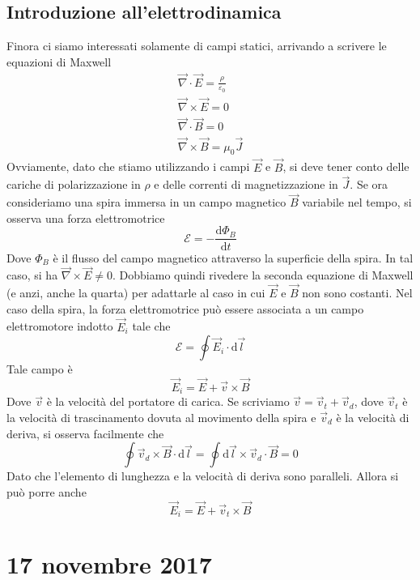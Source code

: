 \documentclass[a4paper,11pt]{book}
\let\oldnabla\nabla
\renewcommand{\nabla}{\vec{\oldnabla}}
\newcommand{\dif}{\mathrm{d}}
\let\oldepsilon\epsilon
\let\oldvarepsilon\varepsilon
\renewcommand{\epsilon}{\oldvarepsilon}
\renewcommand{\varepsilon}{\oldepsilon}
\theoremstyle{definition}
\theoremstyle{theorem}
\begin{document}
\subsection{Introduzione all'elettrodinamica}
Finora ci siamo interessati solamente di campi statici, arrivando a scrivere le equazioni di Maxwell
\[\begin{array}{l}\nabla\cdot\vec{E}=\frac{\rho}{\epsilon_0}\\
\nabla\times\vec{E}=0\\
\nabla\cdot\vec{B}=0\\
\nabla\times\vec{B}=\mu_0\vec{J}\end{array}\]
Ovviamente, dato che stiamo utilizzando i campi $\vec{E}$ e $\vec{B}$, si deve tener conto delle cariche di polarizzazione in $\rho$ e delle correnti di magnetizzazione in $\vec{J}$. Se ora consideriamo una spira immersa in un campo magnetico $\vec{B}$ variabile nel tempo, si osserva una forza elettromotrice
\[\mathcal{E}=-\frac{\dif\Phi_B}{\dif t}\]
Dove $\Phi_B$ è il flusso del campo magnetico attraverso la superficie della spira. In tal caso, si ha $\nabla\times\vec{E}\neq0$. Dobbiamo quindi rivedere la seconda equazione di Maxwell (e anzi, anche la quarta) per adattarle al caso in cui $\vec{E}$ e $\vec{B}$ non sono costanti. Nel caso della spira, la forza elettromotrice può essere associata a un campo elettromotore indotto $\vec{E}_i$ tale che
\[\mathcal{E}=\oint\vec{E}_i\cdot\dif\vec{l}\]
Tale campo è
\[\vec{E}_i=\vec{E}+\vec{v}\times\vec{B}\]
Dove $\vec{v}$ è la velocità del portatore di carica. Se scriviamo $\vec{v}=\vec{v}_t+\vec{v}_d$, dove $\vec{v}_t$ è la velocità di trascinamento dovuta al movimento della spira e $\vec{v}_d$ è la velocità di deriva, si osserva facilmente che
\[\oint\vec{v}_d\times\vec{B}\cdot\dif\vec{l}=\oint\dif\vec{l}\times\vec{v}_d\cdot\vec{B}=0\]
Dato che l'elemento di lunghezza e la velocità di deriva sono paralleli. Allora si può porre anche
\[\vec{E}_i=\vec{E}+\vec{v}_t\times\vec{B}\]
\section{17 novembre 2017}
\end{document}

